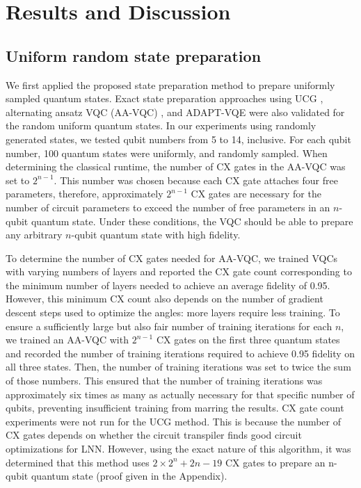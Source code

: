 
\section{Results and Discussion}
\subsection{Uniform random state preparation}

We first applied the proposed state preparation method
to prepare uniformly sampled quantum states. Exact state preparation approaches using UCG 
\cite{bergholm2005quantum}, alternating ansatz VQC (AA-VQC) \cite{zhang2020toward}, and 
ADAPT-VQE \cite{grimsley2019adaptive} were also validated for the random uniform quantum states. In our experiments using randomly generated states, we tested qubit numbers from 5
to 14, inclusive. For each qubit number, 100 quantum states were uniformly, and randomly
sampled. 
When determining the classical runtime, the number of CX gates in the AA-VQC was set 
to $2^{n-1}$. This number was chosen because each CX gate attaches four free 
parameters, therefore, approximately $2^{n-1}$ CX gates are necessary for the 
number of circuit parameters to exceed the number of free parameters in an 
$n$-qubit quantum state. Under these conditions, the VQC should be able to prepare
any arbitrary $n$-qubit quantum state with high fidelity.

To determine the number of CX gates needed for AA-VQC, we trained VQCs with varying 
numbers of layers and reported the CX gate count corresponding to the minimum number 
of layers needed to achieve an average fidelity of 0.95. However, this minimum CX 
count also depends on the number of gradient descent steps used to optimize the 
angles: more layers require less training. To ensure a sufficiently large but also 
fair number of training iterations for each $n$, we trained an AA-VQC with $2^{n-1}$ CX 
gates on the first three quantum states and recorded the number of training 
iterations required to achieve 0.95 fidelity on all three states. Then, the number of 
training iterations was set to twice the sum of those numbers. This ensured that the 
number of training iterations was approximately six times as many as actually 
necessary for that specific number of qubits, preventing insufficient training from 
marring the results. CX gate count experiments were not run for the UCG method. This is because the number 
of CX gates depends on whether the circuit transpiler finds good circuit 
optimizations for LNN. However, using the exact nature of this algorithm, it was 
determined that this method uses $2\times2^n+2n-19$ CX gates to prepare an n-qubit 
quantum state (proof given in the Appendix). 


